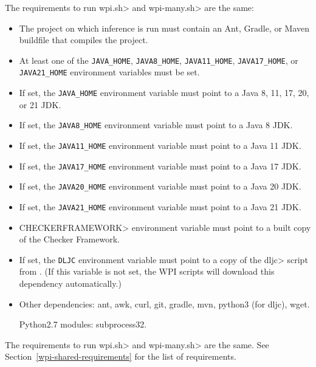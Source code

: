 
The requirements to run \<wpi.sh> and \<wpi-many.sh> are the same:

\begin{itemize}
\item The project on which inference is run must contain an Ant, Gradle,
  or Maven buildfile that compiles the project.
\item At least one of the \verb|JAVA_HOME|,
  \verb|JAVA8_HOME|, \verb|JAVA11_HOME|, \verb|JAVA17_HOME|, or \verb|JAVA21_HOME|
  environment variables must be set.
\item If set, the \verb|JAVA_HOME| environment variable must point to a
  Java 8, 11, 17, 20, or 21 JDK.
\item If set, the \verb|JAVA8_HOME| environment variable must point to a Java 8 JDK.
\item If set, the \verb|JAVA11_HOME| environment variable must point to a Java 11 JDK.
\item If set, the \verb|JAVA17_HOME| environment variable must point to a Java 17 JDK.
\item If set, the \verb|JAVA20_HOME| environment variable must point to a Java 20 JDK.
\item If set, the \verb|JAVA21_HOME| environment variable must point to a Java 21 JDK.
\item \<CHECKERFRAMEWORK> environment variable must point to a built copy of the Checker Framework.
\item If set, the \verb|DLJC| environment variable must point to a copy of the \<dljc> script
from . (If this variable is not
set, the WPI scripts will download this dependency automatically.)
\item Other dependencies:
  ant,
  awk,
  curl,
  git,
  gradle,
  mvn,
  python3 (for dljc),
  wget.

  Python2.7 modules:
  subprocess32.
\end{itemize}




The requirements to run \<wpi.sh> and \<wpi-many.sh> are the same. See Section~\ref{wpi-shared-requirements}
for the list of requirements.


